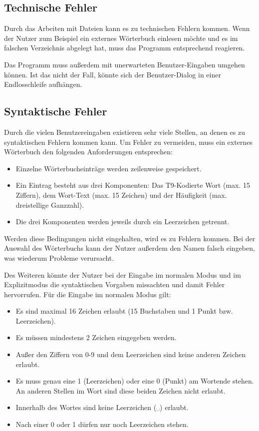 \subsection{Technische Fehler}\label{subsec:technische-fehler}
Durch das Arbeiten mit Dateien kann es zu technischen Fehlern kommen.
Wenn der Nutzer zum Beispiel ein externes Wörterbuch einlesen möchte und es im falschen Verzeichnis abgelegt hat, muss das Programm entsprechend reagieren.

Das Programm muss außerdem mit unerwarteten Benutzer-Eingaben umgehen können.
Ist das nicht der Fall, könnte sich der Benutzer-Dialog in einer Endlosschleife aufhängen.


\subsection{Syntaktische Fehler}\label{subsec:syntaktische-fehler}

Durch die vielen Benutzereingaben existieren sehr viele Stellen, an denen es zu syntaktischen Fehlern kommen kann.
Um Fehler zu vermeiden, muss ein externes Wörterbuch den folgenden Anforderungen entsprechen:
\begin{itemize}[noitemsep]
    \item Einzelne Wörterbucheinträge werden zeilenweise gespeichert.
    \item Ein Eintrag besteht aus drei Komponenten: Das T9-Kodierte Wort (max. 15 Ziffern), dem Wort-Text (max. 15 Zeichen) und der Häufigkeit (max. dreistellige Ganzzahl).
    \item Die drei Komponenten werden jeweils durch ein Leerzeichen getrennt.
\end{itemize}
Werden diese Bedingungen nicht eingehalten, wird es zu Fehlern kommen.
Bei der Auswahl des Wörterbuchs kann der Nutzer außerdem den Namen falsch eingeben, was wiederum Probleme verursacht.

Des Weiteren könnte der Nutzer bei der Eingabe im normalen Modus und im Explizitmodus die syntaktischen Vorgaben missachten und damit Fehler hervorrufen.
Für die Eingabe im normalen Modus gilt:
\begin{itemize}[noitemsep]
    \item Es sind maximal 16 Zeichen erlaubt (15 Buchstaben und 1 Punkt bzw. Leerzeichen).
    \item Es müssen mindestens 2 Zeichen eingegeben werden.
    \item Außer den Ziffern von 0-9 und dem Leerzeichen sind keine anderen Zeichen erlaubt.
    \item Es muss genau eine 1 (Leerzeichen) oder eine 0 (Punkt) am Wortende stehen.
    An anderen Stellen im Wort sind diese beiden Zeichen nicht erlaubt.
    \item Innerhalb des Wortes sind keine Leerzeichen (␣) erlaubt.
    \item Nach einer 0 oder 1 dürfen nur noch Leerzeichen stehen.
\end{itemize}

